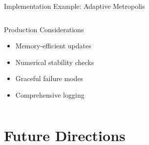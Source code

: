 \documentclass[aspectratio=169,11pt]{beamer}
\begin{document}
\begin{frame}[fragile]{Implementation Example: Adaptive Metropolis}
\begin{columns}
\begin{column}{0.45\textwidth}
\vspace{0.3cm}
\begin{block}{Production Considerations}
\begin{itemize}
\item Memory-efficient updates
\item Numerical stability checks
\item Graceful failure modes
\item Comprehensive logging
\end{itemize}
\end{block}
\end{column}
\end{columns}
\end{frame}

\section{Future Directions}
\end{document}
